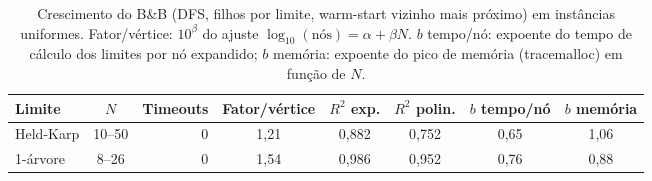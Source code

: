 \begin{table}[htb]
\centering
\caption{Crescimento do B\&B (DFS, filhos por limite, warm-start vizinho mais próximo) em instâncias uniformes. Fator/vértice: $10^{\beta}$ do ajuste $\log_{10}(\text{nós}) = \alpha + \beta N$. $b$ tempo/nó: expoente do tempo de cálculo dos limites por nó expandido; $b$ memória: expoente do pico de memória (tracemalloc) em função de $N$.}
\label{tab:bnbescala}
\small
\begin{adjustbox}{max width=\linewidth}
\begin{tabular}{lcrccccc}
\toprule
Limite & $N$ & Timeouts & Fator/vértice & $R^2$ exp. & $R^2$ polin. & $b$ tempo/nó & $b$ memória \\
\midrule
Held-Karp & 10--50 & 0 & 1{,}21 & 0{,}882 & 0{,}752 & 0{,}65 & 1{,}06 \\
1-árvore & 8--26 & 0 & 1{,}54 & 0{,}986 & 0{,}952 & 0{,}76 & 0{,}88 \\
\bottomrule
\end{tabular}
\end{adjustbox}
\end{table}
